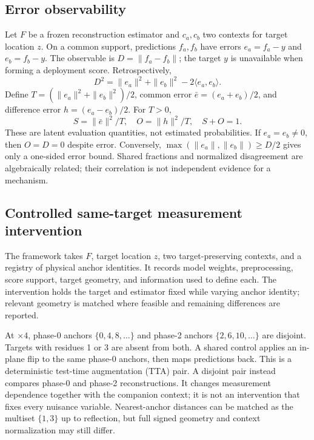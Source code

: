 \documentclass[10pt,twocolumn,letterpaper]{article}
\begin{document}
\subsection{Error observability}
Let $F$ be a frozen reconstruction estimator and $c_a,c_b$ two contexts for target location $z$. On a common support, predictions $f_a,f_b$ have errors $e_a=f_a-y$ and $e_b=f_b-y$. The observable is $D=\|f_a-f_b\|$; the target $y$ is unavailable when forming a deployment score. Retrospectively,
\begin{equation}
D^2=\|e_a\|^2+\|e_b\|^2-2\langle e_a,e_b\rangle .\label{eq:difference}
\end{equation}
Define $T=(\|e_a\|^2+\|e_b\|^2)/2$, common error $\bar e=(e_a+e_b)/2$, and difference error $h=(e_a-e_b)/2$. For $T>0$,
\begin{equation}
S=\|\bar e\|^2/T,\quad O=\|h\|^2/T,\quad S+O=1.\label{eq:energy}
\end{equation}
These are latent evaluation quantities, not estimated probabilities. If $e_a=e_b\ne0$, then $O=D=0$ despite error. Conversely, $\max(\|e_a\|,\|e_b\|)\ge D/2$ gives only a one-sided error bound. Shared fractions and normalized disagreement are algebraically related; their correlation is not independent evidence for a mechanism.

\subsection{Controlled same-target measurement intervention}
The framework takes $F$, target location $z$, two target-preserving contexts, and a registry of physical anchor identities. It records model weights, preprocessing, score support, target geometry, and information used to define each. The intervention holds the target and estimator fixed while varying anchor identity; relevant geometry is matched where feasible and remaining differences are reported.

At $\times4$, phase-0 anchors $\{0,4,8,\ldots\}$ and phase-2 anchors $\{2,6,10,\ldots\}$ are disjoint. Targets with residues 1 or 3 are absent from both. A shared control applies an in-plane flip to the same phase-0 anchors, then maps predictions back. This is a deterministic test-time augmentation (TTA) pair. A disjoint pair instead compares phase-0 and phase-2 reconstructions. It changes measurement dependence together with the companion context; it is not an intervention that fixes every nuisance variable. Nearest-anchor distances can be matched as the multiset $\{1,3\}$ up to reflection, but full signed geometry and context normalization may still differ.
\end{document}
